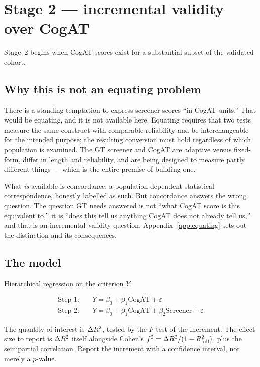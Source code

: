 \documentclass[11pt,a4paper]{article}
\begin{document}
\section{Stage 2 --- incremental validity over CogAT}
\label{sec:stage2}

Stage~2 begins when CogAT scores exist for a substantial subset of the validated
cohort.

\subsection{Why this is not an equating problem}

There is a standing temptation to express screener scores ``in CogAT units.''
That would be equating, and it is not available here. Equating requires that two
tests measure the same construct with comparable reliability and be
interchangeable for the intended purpose; the resulting conversion must hold
regardless of which population is examined. The GT screener and CogAT are
adaptive versus fixed-form, differ in length and reliability, and are being
designed to measure partly different things --- which is the entire premise of
building one.

What \emph{is} available is concordance: a population-dependent statistical
correspondence, honestly labelled as such. But concordance answers the wrong
question. The question GT needs answered is not ``what CogAT score is this
equivalent to,'' it is ``does this tell us anything CogAT does not already tell
us,'' and that is an incremental-validity question.
Appendix~\ref{app:equating} sets out the distinction and its consequences.

\subsection{The model}

Hierarchical regression on the criterion $Y$:

\begin{align}
\text{Step 1:}\quad & Y = \beta_0 + \beta_1 \text{CogAT} + \varepsilon \\
\text{Step 2:}\quad & Y = \beta_0 + \beta_1 \text{CogAT} + \beta_2 \text{Screener} + \varepsilon
\end{align}

The quantity of interest is $\Delta R^{2}$, tested by the $F$-test of the increment. The
effect size to report is $\Delta R^{2}$ itself alongside Cohen's
$f^2=\Delta R^{2}/(1-R^2_{\text{full}})$, plus the semipartial correlation. Report the
increment with a confidence interval, not merely a $p$-value.
\end{document}
